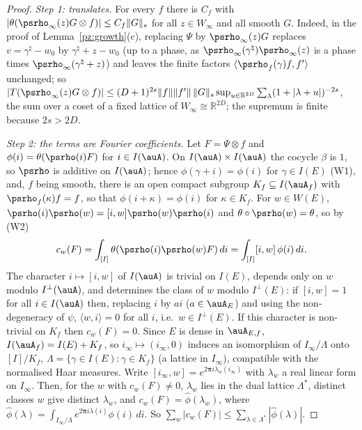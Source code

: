 \documentclass[10pt]{amsart}
\theoremstyle{definition}
\theoremstyle{remark}
\newcommand{\R}{\mathbb R}
\begin{document}
\begin{proof}
\emph{Step 1: translates.} For every $f$ there is $C_f$ with $|\theta(\psrho_\infty(z)G\otimes f)|\le
C_f\|G\|_s$ for all $z\in W_\infty$ and all smooth $G$. Indeed, in the proof of Lemma~\ref{pz:growth}(c),
replacing $\Psi$ by $\psrho_\infty(z)G$ replaces $v=\gamma^\natural-w_0$ by $\gamma^\natural+z-w_0$ (up to a
phase, as $\psrho_\infty(\gamma^\natural)\psrho_\infty(z)$ is a phase times $\psrho_\infty(\gamma^\natural+z)$) and
leaves the finite factors $\langle\psrho_f(\gamma)f,f'\rangle$ unchanged; so $|T(\psrho_\infty(z)G\otimes
f)|\le(D+1)^{2s}\|f\|\|f'\|\,\|G\|_s\sup_{u\in\R^{2D}}\sum_\lambda(1+|\lambda+u|)^{-2s}$, the sum over a coset
of a fixed lattice of $W_\infty\cong\R^{2D}$; the supremum is finite because $2s>2D$.

\emph{Step 2: the terms are Fourier coefficients.} Let $F=\Psi\otimes f$ and
$\phi(i)=\theta(\psrho(i)F)$ for $i\in I(\auA)$. On $I(\auA)\times I(\auA)$ the cocycle $\beta$ is $1$, so
$\psrho$ is additive on $I(\auA)$; hence $\phi(\gamma+i)=\phi(i)$ for $\gamma\in I(E)$ (W1), and, $f$ being
smooth, there is an open compact subgroup $K_f\subseteq I(\auA_f)$ with $\psrho_f(\kappa)f=f$, so that
$\phi(i+\kappa)=\phi(i)$ for $\kappa\in K_f$. For $w\in W(E)$, $\psrho(i)\psrho(w)=[i,w]\psrho(w)\psrho(i)$
and $\theta\circ\psrho(w)=\theta$, so by (W2)
\[
c_w(F)=\int_{[I]}\theta(\psrho(i)\psrho(w)F)\,di=\int_{[I]}[i,w]\,\phi(i)\,di .
\]
The character $i\mapsto[i,w]$ of $I(\auA)$ is trivial on $I(E)$, depends only on $w$ modulo
$I^\perp(\auA)$, and determines the class of $w$ modulo $I^\perp(E)$: if $[i,w]=1$ for all $i\in I(\auA)$
then, replacing $i$ by $ai$ ($a\in\auA_E$) and using the non-degeneracy of $\psi$, $\langle w,i\rangle=0$
for all $i$, i.e.\ $w\in I^\perp(E)$. If this character is non-trivial on $K_f$ then $c_w(F)=0$. Since $E$
is dense in $\auA_{E,f}$, $I(\auA_f)=I(E)+K_f$, so $i_\infty\mapsto(i_\infty,0)$ induces an isomorphism of
$I_\infty/\Lambda$ onto $[I]/K_f$, $\Lambda=\{\gamma\in I(E):\gamma\in K_f\}$ (a lattice in $I_\infty$),
compatible with the normalised Haar measures. Write $[i_\infty,w]=e^{2\boldsymbol\pi i\lambda_w(i_\infty)}$
with $\lambda_w$ a real linear form on $I_\infty$. Then, for the $w$ with $c_w(F)\ne0$, $\lambda_w$ lies in the
dual lattice $\Lambda^*$, distinct classes $w$ give distinct $\lambda_w$, and $c_w(F)=\hat\phi(\lambda_w)$, where
$\hat\phi(\lambda)=\int_{I_\infty/\Lambda}e^{2\boldsymbol\pi i\lambda(i)}\phi(i)\,di$. So
$\sum_w|c_w(F)|\le\sum_{\lambda\in\Lambda^*}|\hat\phi(\lambda)|$.


\end{proof}
\end{document}
